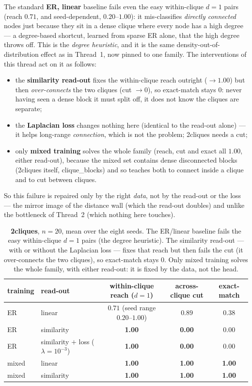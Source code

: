 \documentclass[11pt,a4paper]{article}
\begin{document}
The standard \textbf{ER, linear} baseline fails even the easy within-clique $d=1$ pairs (reach
$0.71$, and seed-dependent, $0.20$--$1.00$): it mis-classifies \emph{directly connected} nodes
just because they sit in a dense clique where every node has a high degree --- a degree-based
shortcut, learned from sparse ER alone, that the high degree throws off. This is the
\emph{degree heuristic}, and it is the same density-out-of-distribution effect as in Thread~1, now
pinned to one family. The interventions of this thread act on it as follows:
\begin{itemize}\setlength\itemsep{0.1em}
  \item the \textbf{similarity read-out} fixes the within-clique reach outright ($\to1.00$) but
        then \emph{over-connects} the two cliques (cut $\to0$), so exact-match stays $0$: never
        having seen a dense block it must split off, it does not know the cliques are separate;
  \item the \textbf{Laplacian loss} changes nothing here (identical to the read-out alone) --- it
        helps long-range \emph{connection}, which is not the problem; 2cliques needs a cut;
  \item only \textbf{mixed training} solves the whole family (reach, cut and exact all $1.00$,
        either read-out), because the mixed set contains dense disconnected blocks (2cliques
        itself, clique\_blocks) and so teaches both to connect inside a clique and to cut between
        cliques.
\end{itemize}
So this failure is repaired only by the right \emph{data}, not by the read-out or the loss ---
the mirror image of the distance wall (which the read-out doubles) and unlike the bottleneck of
Thread~2 (which nothing here touches).

\begin{table}[H]\centering\small
\begin{tabular}{llccc}
\toprule
training & read-out & within-clique reach ($d{=}1$) & across-clique cut & exact-match \\
\midrule
ER    & linear                          & $0.71$ (seed range $0.20$--$1.00$) & $0.89$ & $0.38$ \\
ER    & similarity                      & \textbf{1.00} & \textbf{0.00} & $0.00$ \\
ER    & similarity $+$ loss ($\lambda{=}10^{-3}$) & \textbf{1.00} & \textbf{0.00} & $0.00$ \\
mixed & linear                          & \textbf{1.00} & \textbf{1.00} & \textbf{1.00} \\
mixed & similarity                      & \textbf{1.00} & \textbf{1.00} & \textbf{1.00} \\
\bottomrule
\end{tabular}
\caption{\textbf{2cliques}, $n=20$, mean over the eight seeds. The ER/linear baseline fails the
easy within-clique $d{=}1$ pairs (the degree heuristic). The similarity read-out --- with or
without the Laplacian loss --- fixes that reach but then fails the cut (it over-connects the two
cliques), so exact-match stays $0$. Only mixed training solves the whole family, with either
read-out: it is fixed by the data, not the head.}
\label{tab:degree}
\end{table}
\end{document}
